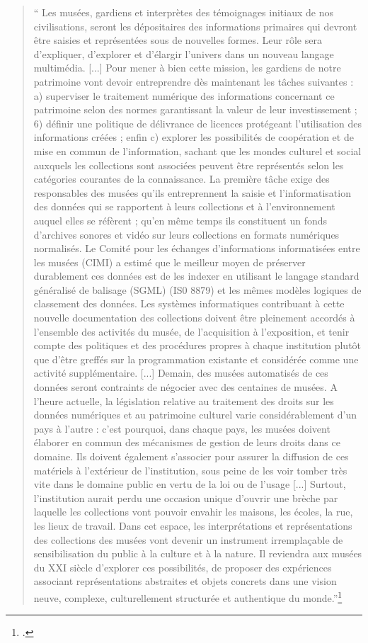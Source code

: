 \begin{quote}
    “ Les musées, gardiens et interprètes des témoignages initiaux de nos civilisations, seront les dépositaires des informations primaires qui devront être saisies et représentées sous de nouvelles formes. Leur rôle sera d'expliquer, d'explorer et d'élargir l'univers dans un nouveau langage multimédia. [...] Pour mener à bien cette mission, les gardiens de notre patrimoine vont devoir entreprendre dès maintenant les tâches suivantes : a) superviser le traitement numérique des informations  concernant ce patrimoine selon des normes garantissant la valeur de leur investissement ; 6) définir une politique de délivrance de licences protégeant l'utilisation des informations créées ; enfin c) explorer les possibilités de coopération  et de mise en commun  de l'information, sachant que les mondes culturel et social auxquels les collections sont associées peuvent être représentés selon les catégories courantes de la connaissance. La première tâche exige des responsables des musées  qu'ils entreprennent la saisie et l'informatisation des données qui se rapportent à leurs collections et à l'environnement auquel elles se réfèrent ; qu'en même temps ils constituent un fonds d'archives sonores et vidéo sur leurs collections en formats numériques  normalisés. Le Comité pour les échanges d'informations informatisées entre les musées (CIMI) a estimé que le meilleur moyen de préserver durablement ces données est de les indexer en utilisant le langage standard généralisé de balisage (SGML) (IS0 8879) et les mêmes modèles logiques de classement des données. Les systèmes informatiques contribuant à cette nouvelle documentation des collections doivent  être pleinement accordés à l'ensemble des activités du musée, de l'acquisition à l'exposition, et tenir compte des politiques et des procédures propres à chaque institution plutôt  que d'être greffés sur la  programmation existante et considérée comme une activité supplémentaire. 
[...]
Demain, des musées automatisés de ces données seront contraints de négocier avec  des centaines de musées. A l'heure actuelle, la  législation relative au traitement des droits sur les données numériques et au patrimoine culturel varie considérablement d'un pays à l'autre : c'est pourquoi, dans chaque pays, les musées doivent élaborer en commun des mécanismes de gestion de leurs droits dans ce domaine. Ils doivent également s'associer pour assurer la diffusion de ces matériels à l'extérieur de l'institution, sous peine de les voir tomber très vite dans le domaine public en vertu de la loi ou de l'usage [...] Surtout, l'institution  aurait perdu une occasion unique  d'ouvrir une brèche par laquelle les collections vont pouvoir envahir les maisons, les écoles, la rue, les lieux de travail. Dans cet espace, les interprétations et représentations des collections des musées vont devenir un instrument irremplaçable de sensibilisation du public à la culture et à la nature. Il reviendra aux musées du XXI siècle d'explorer ces possibilités, de proposer des expériences associant représentations abstraites et objets concrets dans une vision neuve, complexe, culturellement structurée et authentique du monde.”\footcite{Bearman_1994}
\end{quote} 
